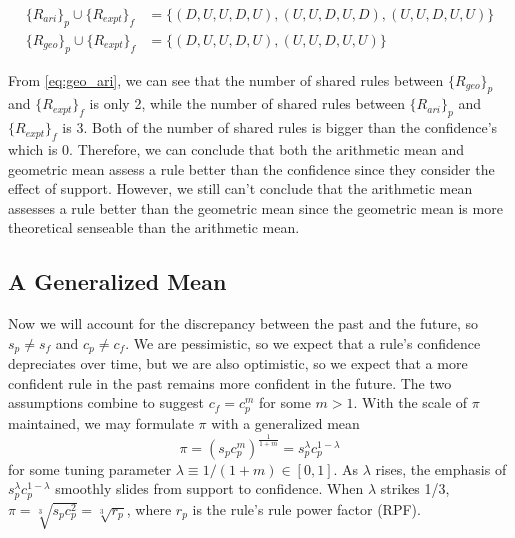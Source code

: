 \documentclass[runningheads]{llncs}
\begin{document}
\begin{equation}
    \label{eq:geo_ari}
    \begin{aligned}
        \{R_{ari}\}_p\cup \{R_{expt}\}_f & = \{(D, U, U, D, U),(U, U, D, U, D),(U, U, D, U, U)\} \\
        \{R_{geo}\}_p\cup \{R_{expt}\}_f & = \{(D, U, U, D, U), (U, U, D, U, U)\}
    \end{aligned}
\end{equation}

From \eqref{eq:geo_ari}, we can see that the number of shared rules between $\{R_{geo}\}_p$ and $\{R_{expt}\}_f$ is only 2, while the number of shared rules between $\{R_{ari}\}_p$ and $\{R_{expt}\}_f$ is 3.
Both of the number of shared rules is bigger than the confidence's which is 0.
Therefore, we can conclude that both the arithmetic mean and geometric mean assess a rule better than the confidence since they consider the effect of support.
However, we still can't conclude that the arithmetic mean assesses a rule better than the geometric mean since the geometric mean is more theoretical senseable than the arithmetic mean.

\subsection{A Generalized Mean}
Now we will account for the discrepancy between the past and the future, so $s_p\neq s_f$ and $c_p\neq c_f$. We are pessimistic, so we expect that a rule's confidence depreciates over time, but we are also optimistic, so we expect that a more confident rule in the past remains more confident in the future.
The two assumptions combine to suggest $c_f=c_p^m$ for some $m > 1$. With the scale of $\pi$ maintained, we may formulate $\pi$ with a generalized mean
$$
    \pi=(s_pc_p^m)^{\frac1{1+m}}=s_p^\lambda c_p^{1-\lambda}
$$
for some tuning parameter $\lambda \equiv  1/(1 + m) \in [0, 1]$.
As $\lambda$ rises, the emphasis of $s_p^\lambda c_p^{1-\lambda}$ smoothly slides from support to confidence.
When $\lambda$ strikes 1/3,$\pi=\sqrt[3]{s_pc_p^2}=\sqrt[3]{r_p}$, where $r_p$ is the rule's rule power factor (RPF).
\end{document}
